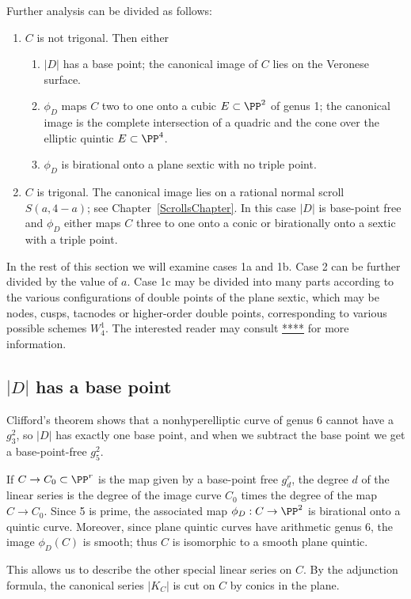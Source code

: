 Further analysis can be divided as follows:
\begin{enumerate}
\item $C$ is not trigonal. Then either
\begin{enumerate}
 \item $|D|$ has a base point; the canonical image of $C$ lies on the Veronese surface.
\item $\phi_{D}$ maps $C$ two to one onto a cubic $E \subset \PP^2$ of genus 1; the canonical image is the complete intersection of a quadric and the cone over the elliptic quintic $E\subset \PP^{4}$.
\item $\phi_{D}$ is birational onto a plane sextic with no triple point.
 \end{enumerate}
 \item $C$ is trigonal. The canonical image lies on a 
rational normal scroll $S(a,4-a)$; see Chapter~\ref{ScrollsChapter}.
In this case $|D|$ is base-point free and $\phi_{D}$  either maps $C$ three to one onto a conic
 or birationally onto a sextic with a triple point. 
\end{enumerate}

In the rest of this section we will examine cases 1a and 1b. Case 2 can be further divided by the value of $a$.
Case 1c may be divided into many parts according to the various configurations
of double points of the plane sextic, which may be nodes, cusps, tacnodes or higher-order double points,  corresponding to various possible schemes $W^{1}_{4}$. The interested reader may consult \url{****} for more information.

\subsection{$|D|$ has a base point}\label{g26 has a base point}
Clifford's theorem shows that a nonhyperelliptic curve of genus 6 cannot have a $g^2_3$, so   
$|D|$ has exactly one base point, and when we subtract the base point we get a base-point-free $g^2_5$. 

If $C \to C_0 \subset \PP^r$ is the map given by a base-point free $g^r_d$, the degree $d$ of the linear series is the degree of the image curve $C_0$ times the degree of the map $C \to C_0$. Since 5 is prime, the associated map $\phi_D : C \to \PP^2$ is birational onto a quintic curve. Moreover, since plane quintic curves have arithmetic genus 6, the image $\phi_D(C)$ is smooth; thus $C$ is isomorphic to a smooth plane quintic.

This allows us to describe the other special linear series on $C$. By the adjunction formula, the canonical series $|K_C|$ is cut on $C$ by conics in the plane. 

